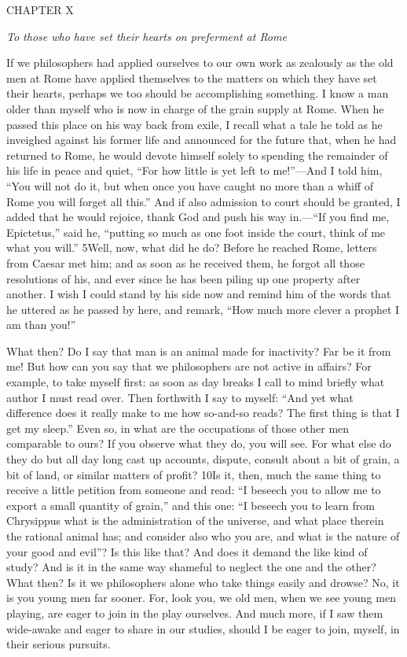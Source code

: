 CHAPTER X

\emph{To those who have set their hearts on preferment at Rome}

If we philosophers had applied ourselves to our own work as zealously as the old men at Rome have applied themselves to the matters on which they have set their hearts, perhaps we too should be accomplishing something. I know a man older than myself who is now in charge of the grain supply at Rome. When he passed this place on his way back from exile, I recall what a tale he told as he inveighed against his former life and announced for the future that, when he had returned to Rome, he would devote himself solely to spending the remainder of his life in peace and quiet, ``For how little is yet left to me!''—And I told him, ``You will not do it, but when once you have caught no more than a whiff of Rome you will forget all this.'' And if also admission to court should be granted, I added that he would rejoice, thank God and push his way in.—``If you find me, Epictetus,'' said he, ``putting so much as one foot inside the court, think of me what you will.'' 5Well, now, what did he do? Before he reached Rome, letters from Caesar met him; and as soon as he received them, he forgot all those resolutions of his, and ever since he has been piling up one property after another. I wish I could stand by his side now and remind him of the words that he uttered as he passed by here, and remark, ``How much more clever a prophet I am than you!''

What then? Do I say that man is an animal made for inactivity? Far be it from me! But how can you say that we philosophers are not active in affairs? For example, to take myself first: as soon as day breaks I call to mind briefly what author I must read over. Then forthwith I say to myself: ``And yet what difference does it really make to me how so-and-so reads? The first thing is that I get my sleep.'' Even so, in what are the occupations of those other men comparable to ours? If you observe what they do, you will see. For what else do they do but all day long cast up accounts, dispute, consult about a bit of grain, a bit of land, or similar matters of profit? 10Is it, then, much the same thing to receive a little petition from someone and read: ``I beseech you to allow me to export a small quantity of grain,'' and this one: ``I beseech you to learn from Chrysippus what is the administration of the universe, and what place therein the rational animal has; and consider also who you are, and what is the nature of your good and evil''? Is this like that? And does it demand the like kind of study? And is it in the same way shameful to neglect the one and the other? What then? Is it we philosophers alone who take things easily and drowse? No, it is you young men far sooner. For, look you, we old men, when we see young men playing, are eager to join in the play ourselves. And much more, if I saw them wide-awake and eager to share in our studies, should I be eager to join, myself, in their serious pursuits.

